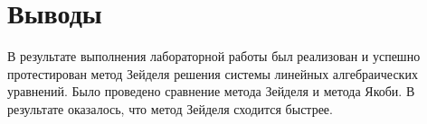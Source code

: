 \documentclass[a4paper, 14pt]{extarticle}
\begin{document}
\section{Выводы}
В результате выполнения лабораторной работы был реализован и успешно протестирован метод Зейделя решения системы линейных алгебраических уравнений. Было проведено сравнение метода Зейделя и метода Якоби. В результате оказалось, что метод Зейделя сходится быстрее.
\end{document}
